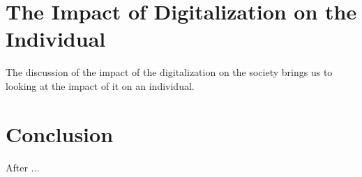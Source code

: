 \documentclass[12pt]{article}
\begin{document}
\section{The Impact of Digitalization on the Individual}
The discussion of the impact of the digitalization on the society brings us to looking at the impact of it on an individual. \\

\section{Conclusion}
After ...

\newpage

\end{document}
